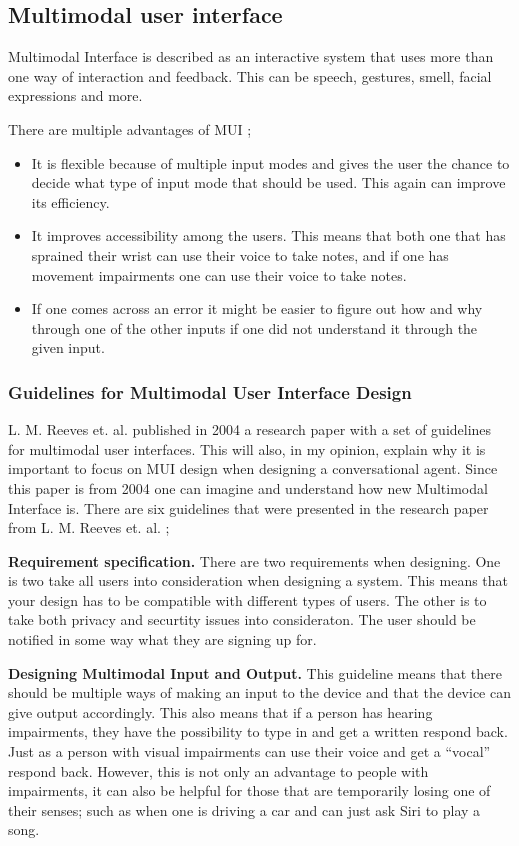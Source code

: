 \subsection{Multimodal user interface}
Multimodal Interface is described as an interactive system that uses more than one way of interaction and feedback. This can be speech, gestures, smell, facial expressions and more. \cite{turk.m}

There are multiple advantages of MUI \cite{turk.m}; 
\begin{itemize}
    \item It is flexible because of multiple input modes and gives the user the chance to decide what type of input mode that should be used. This again can improve its efficiency.  
    \item It improves accessibility among the users. This means that both one that has sprained their wrist can use their voice to take notes, and if one has movement impairments one can use their voice to take notes. 
    \item If one comes across an error it might be easier to figure out how and why through one of the other inputs if one did not understand it through the given input. 
\end{itemize}

\subsubsection{Guidelines for Multimodal User Interface Design} 
L. M. Reeves et. al. \cite{reeves.lm} published in 2004 a research paper with a set of guidelines for multimodal user interfaces. This will also, in my opinion, explain why it is important to focus on MUI design when designing a conversational agent. Since this paper is from 2004 one can imagine and understand how new Multimodal Interface is.  There are six guidelines that were presented in the research paper from L. M. Reeves et. al. \cite{reeves.lm}; 

\textbf{Requirement specification.}
There are two requirements when designing. One is two take all users into consideration when designing a system. This means that your design has to be compatible with different types of users. The other is to take both privacy and securtity issues into consideraton. The user should be notified in some way what they are signing up for. 

\textbf{Designing Multimodal Input and Output.}
This guideline means that there should be multiple ways of making an  input to the device and that the device can give output accordingly. 
This also means that if a person has hearing impairments, they have the possibility to type in and get a written respond back. Just as a person with visual impairments can use their voice and get a “vocal” respond back.
However, this is not only an advantage to people with impairments, it can also be helpful for those that are temporarily losing one of their senses; such as when one is driving a car and can just ask Siri to play a song. 

